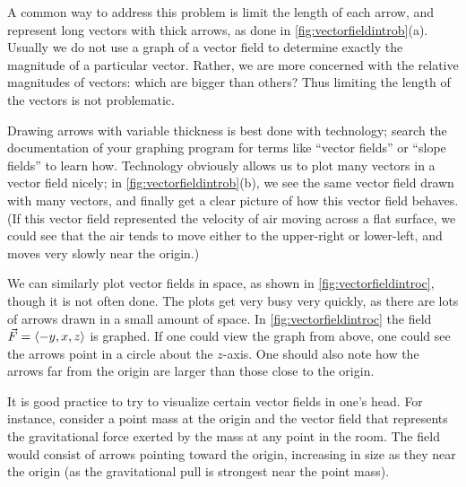 A common way to address this problem is limit the length of each arrow, and represent long vectors with thick arrows, as done in \autoref{fig:vectorfieldintrob}(a). Usually we do not use a graph of a vector field to determine exactly the magnitude of a particular vector. Rather, we are more concerned with the relative magnitudes of vectors: which are bigger than others? Thus limiting the length of the vectors is not problematic.

Drawing arrows with variable thickness is best done with technology; search the documentation of your graphing program for terms like ``vector fields'' or ``slope fields'' to learn how. Technology obviously allows us to plot many vectors in a vector field nicely; in \autoref{fig:vectorfieldintrob}(b), we see the same vector field drawn with many vectors, and finally get a clear picture of how this vector field behaves. (If this vector field represented the velocity of air moving across a flat surface, we could see that the air tends to move either to the upper-right or lower-left, and moves very slowly near the origin.)

We can similarly plot vector fields in space, as shown in \autoref{fig:vectorfieldintroc}, though it is not often done. The plots get very busy very quickly, as there are lots of arrows drawn in a small amount of space. In \autoref{fig:vectorfieldintroc} the field $\vec F =\left\langle -y,x,z\right\rangle$ is graphed. If one could view the graph from above, one could see the arrows point in a circle about the $z$-axis. One should also note how the arrows far from the origin are larger than those close to the origin. 


It is good practice to try to visualize certain vector fields in one's head. For instance, consider a point mass at the origin and the vector field that represents the gravitational force exerted by the mass at any point in the room. The field would consist of arrows pointing toward the origin, increasing in size as they near the origin (as the gravitational pull is strongest near the point mass).


